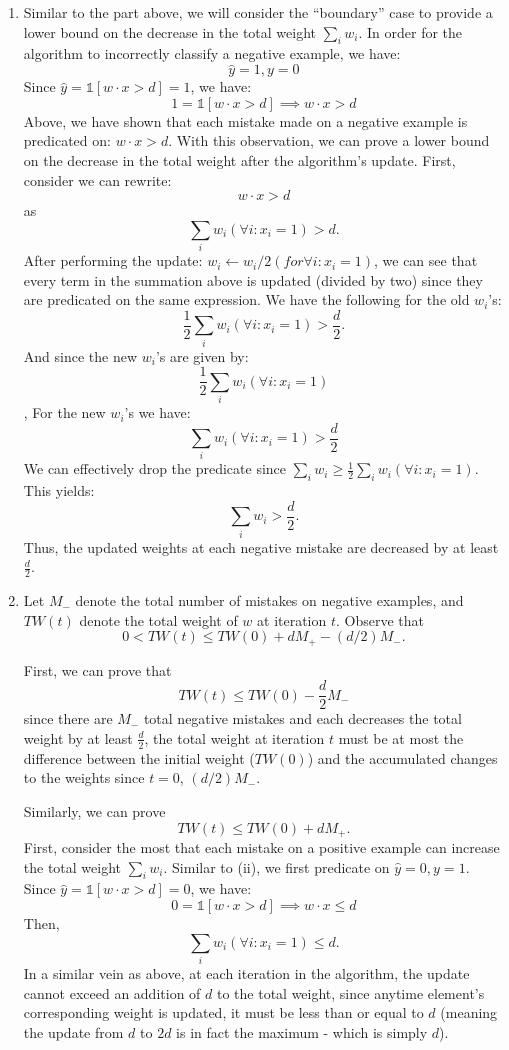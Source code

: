 \documentclass[twoside,11pt]{homework}
\DeclarePairedDelimiter{\2norm}{\lVert}{\rVert^2_2}
\newcommand{\1}[1]{\mathds{1}\left[#1\right]}
\begin{document}
\begin{enumerate}[\bf (i)]
	\item
	Similar to the part above, we will consider the ``boundary'' case to provide
	a lower bound on the decrease in the total weight $\sum_{i}w_{i}$.
	In order for the algorithm to incorrectly classify a negative example, we
	have:
	\[
	\hat{y} = 1 , y = 0
	\]
	Since $\hat{y} = \1{w \cdot x > d} = 1$, we have:
	\[
	1 = \1{w \cdot x > d}
	\implies w \cdot x > d
	\]
	Above, we have shown that each mistake made on a negative example is
	predicated on: $ w \cdot x > d$. With this observation, we can prove a lower
	bound on the decrease in the total weight after the algorithm's update.
	First, consider we can rewrite:
	\[
	w \cdot x > d
	\]
	as
	\[
	\sum_{i}w_{i} (\forall i : x_{i} = 1) > d.
	\]
	After performing the update:
	$w_i \leftarrow w_{i}/2 (for \forall i : x_{i} = 1)$, we can see that every
	term in the summation above is updated (divided by two) since they are
	predicated on the same expression. We have the following for the old
	$w_{i}$'s:
	\[
	\frac{1}{2}\sum_{i}w_{i} (\forall i : x_{i} = 1) > \frac{d}{2}.
	\]
	And since the new $w_{i}$'s are given by:
	\[
	\frac{1}{2}\sum_{i}w_{i} (\forall i : x_{i} = 1)
	\],
	For the new $w_{i}$'s we have:
	\[
	\sum_{i}w_{i} (\forall i : x_{i} = 1) > \frac{d}{2}
	\]
	We can effectively drop the predicate since $\sum_{i}w_{i} \geq
	\frac{1}{2}\sum_{i}w_{i} (\forall i : x_{i} = 1)$. This yields:
	\[
	\sum_{i}w_{i}  > \frac{d}{2}.
	\]
	Thus, the updated weights at each negative mistake are decreased by at least
	$\frac{d}{2}$.
	
	\item
	Let $M_{-}$ denote the total number of mistakes on negative examples, and
	$TW(t)$ denote the total weight of $w$ at iteration $t$. Observe that
	\[
	0 < TW(t) \leq TW(0) + dM_{+} - (d/2)M_{-}.
	\]
	
	First, we can prove that
	\[
	TW(t) \leq TW(0) - \frac{d}{2}M_{-}
	\]
	since there are $M_{-}$ total negative mistakes and each decreases the total
	weight by at least $\frac{d}{2}$, the total weight at iteration $t$ must be at most the
	difference between the initial weight ($TW(0)$) and the accumulated changes
	to the weights since $t=0$, $(d/2)M_{-}$.
	
	Similarly, we can prove
	\[
	TW(t) \leq TW(0) + dM_{+}.
	\]
	First, consider the most that each mistake on a positive example can
	increase the total weight $\sum_{i}w_{i}$. Similar to (ii), we first
	predicate on $\hat{y} = 0, y = 1$.
	Since $\hat{y} = \1{w \cdot x > d} = 0$, we have:
	\[
	0 = \1{w \cdot x > d}
	\implies w \cdot x \leq d
	\]
	Then,
	\[
	\sum_{i}w_{i} (\forall i : x_{i} = 1) \leq d.
    \]
In a similar vein as above, at each iteration in the algorithm, the update
    cannot exceed an addition of $d$ to the total weight, since anytime
    element's corresponding weight is updated, it must be less than or equal to
    $d$ (meaning the update from $d$ to $2d$ is in fact the maximum - which is
    simply $d$).


\end{enumerate}
\end{document}
